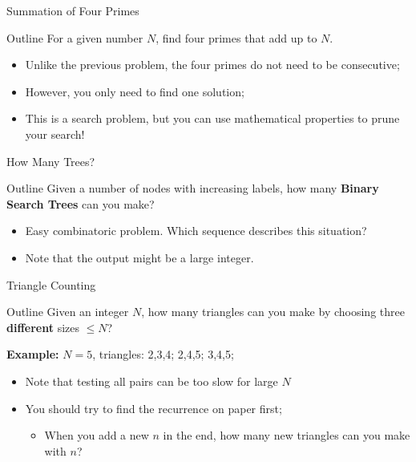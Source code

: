 \begin{frame}{Summation of Four Primes}
  \begin{block}{Outline}
    For a given number $N$, find four primes that add up to $N$.
  \end{block}\bigskip

  \begin{itemize}
    \item Unlike the previous problem, the four primes do not need to be consecutive;
    \item However, you only need to find one solution;
    \item This is a search problem, but you can use mathematical properties to prune your search!
  \end{itemize}
\end{frame}

\begin{frame}{How Many Trees?}
  \begin{block}{Outline}
    Given a number of nodes with increasing labels, how many {\bf Binary Search Trees} can you make?
  \end{block}\bigskip

  \begin{itemize}
    \item Easy combinatoric problem. Which sequence describes this situation?
    \item Note that the output might be a large integer.
  \end{itemize}
\end{frame}

\begin{frame}{Triangle Counting}
  \begin{block}{Outline}
    Given an integer $N$, how many triangles can you make by choosing three {\bf different} sizes $\leq N$?\bigskip

    {\bf Example:} $N = 5$, triangles: 2,3,4; 2,4,5; 3,4,5;
  \end{block}\bigskip

  \begin{itemize}
    \item Note that testing all pairs can be too slow for large $N$
    \item You should try to find the recurrence on paper first;
    \begin{itemize}
      \item When you add a new $n$ in the end, how many new triangles can you make with $n$?
    \end{itemize}
  \end{itemize}
\end{frame}

